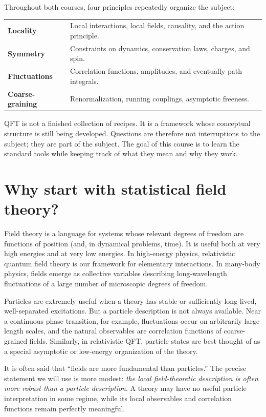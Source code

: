 \documentclass[11pt]{article}
\begin{document}
Throughout both courses, four principles repeatedly organize the subject:
\begin{keyidea}
\begin{tabular}{>{\bfseries}p{} p{}}
Locality & Local interactions, local fields, causality, and the action principle. \\
Symmetry & Constraints on dynamics, conservation laws, charges, and spin. \\
Fluctuations & Correlation functions, amplitudes, and eventually path integrals. \\
Coarse-graining & Renormalization, running couplings, asymptotic freeness.
\end{tabular}
\end{keyidea}
QFT is not a finished collection of recipes.  It is a framework whose conceptual structure is still being developed.  Questions are therefore not interruptions to the subject; they are part of the subject.  The goal of this course is to learn the standard tools while keeping track of what they mean and why they work.


\section{Why start with statistical field theory?}

Field theory is a language for systems whose relevant degrees of freedom are functions of position (and, in dynamical problems, time).  It is useful both at very high energies and at very low energies.  In high-energy physics, relativistic quantum field theory is our framework for elementary interactions.  In many-body physics, fields emerge as collective variables describing long-wavelength fluctuations of a large number of microscopic degrees of freedom.

Particles are extremely useful when a theory has stable or sufficiently long-lived, well-separated excitations.  But a particle description is not always available.  Near a continuous phase transition, for example, fluctuations occur on arbitrarily large length scales, and the natural observables are correlation functions of coarse-grained fields.  Similarly, in relativistic QFT, particle states are best thought of as a special asymptotic or low-energy organization of the theory.

\begin{remarkbox}
It is often said that ``fields are more fundamental than particles.''  The precise statement we will use is more modest: \emph{the local field-theoretic description is often more robust than a particle description}.  A theory may have no useful particle interpretation in some regime, while its local observables and correlation functions remain perfectly meaningful.
\end{remarkbox}
\end{document}
